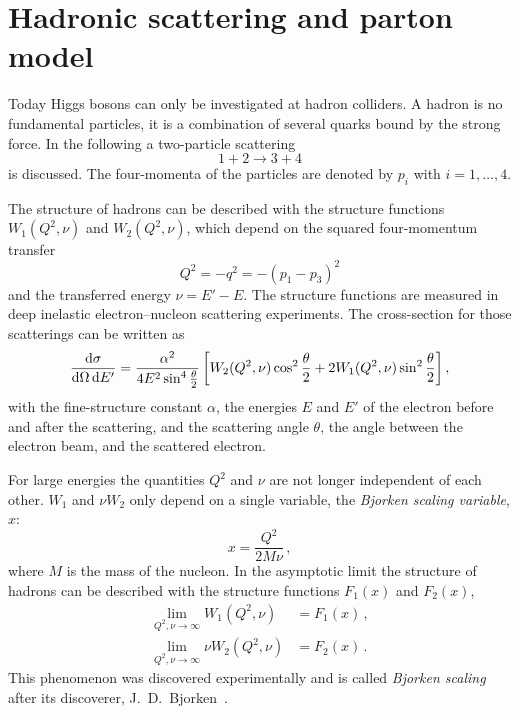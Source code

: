\section{Hadronic scattering and parton model}\label{sec:theory:hadronscattering}

Today Higgs bosons can only be investigated at hadron colliders.
A hadron is no fundamental particles, it is a combination of several quarks bound by the strong force.
In the following a two-particle scattering
\begin{equation}
    1 + 2 \to 3 + 4
\end{equation}
is discussed.
The four-momenta of the particles are denoted by $p_i$ with $i = 1,\ldots,4$.

The structure of hadrons can be described with the structure functions $W_1(Q^2, \nu)$ and $W_2(Q^2, \nu)$,
which depend on the squared four-momentum transfer
\begin{equation}
    Q^2 = -q^2 = - (p_1 - p_3)^2
\end{equation}
and the transferred energy $\nu = E' - E$.
The structure functions are measured in deep inelastic electron--nucleon scattering experiments.
The cross-section for those scatterings can be written as~\cite{drell64, bjo:scaling}
\begin{equation}
    \frac{\dif \sigma}{\dif\Omega \dif E'} = \frac{\alpha^2}{4 E^2 \sin^4 \frac{\theta}{2}}
    \left[ W_2(Q^2, \nu) \cos^2 \frac{\theta}{2} + 2 W_1(Q^2, \nu) \sin^2 \frac{\theta}{2} \right ],
\end{equation}
with the fine-structure constant $\alpha$, the energies $E$ and $E'$ of the electron before and after the scattering,
and the scattering angle $\theta$, the angle between the electron beam, and the scattered electron.

For large energies the quantities $Q^2$ and $\nu$ are not longer independent of each other.
$W_1$ and $\nu W_2$ only depend on a single variable, the \emph{Bjorken scaling variable}, $x$:
\begin{equation}
    x = \frac{Q^2}{2 M \nu} \,,
\end{equation}
where $M$ is the mass of the nucleon.
In the asymptotic limit the structure of hadrons can be described with the structure functions $F_1(x)$ and $F_2(x)$,
\begin{equation}
    \begin{split}
        \lim_{Q^2, \nu \to \infty} W_1(Q^2, \nu) &= F_1(x) \,, \\
        \lim_{Q^2, \nu \to \infty} \nu W_2(Q^2, \nu) &= F_2(x) \,.
    \end{split}
\end{equation}
This phenomenon was discovered experimentally and is called \emph{Bjorken scaling} after its discoverer, J.\ D.\ Bjorken~\cite{bjo:scaling}.

